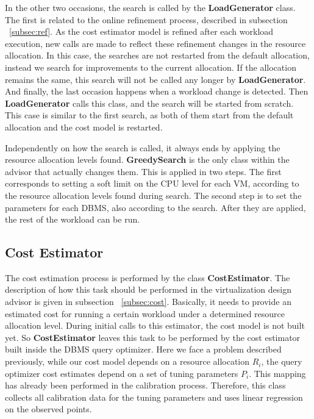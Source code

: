 In the other two occasions, the search is called by the \textbf{LoadGenerator} class. The first is related to the online refinement process, described in subsection ~\ref{subsec:ref}. As the cost estimator model is refined after each workload execution, new calls are made to reflect these refinement changes in the resource allocation. In this case, the searches are not restarted from the default allocation, instead we search for improvements to the current allocation. If the allocation remains the same, this search will not be called any longer by \textbf{LoadGenerator}. And finally, the last occasion happens when a workload change is detected. Then \textbf{LoadGenerator} calls this class, and the search will be started from scratch. This case is similar to the first search, as both of them start from the default allocation and the cost model is restarted.

Independently on how the search is called, it always ends by applying the resource allocation levels found. \textbf{GreedySearch} is the only class within the advisor that actually changes them. This is applied in two steps. The first corresponds to setting a soft limit on the CPU level for each VM, according to the resource allocation levels found during search. The second step is to set the parameters for each DBMS, also according to the search. After they are applied, the rest of the workload can be run.

\subsection{Cost Estimator}

The cost estimation process is performed by the class \textbf{CostEstimator}. The description of how this task should be performed in the virtualization design advisor is given in subsection ~\ref{subsec:cost}. Basically, it needs to provide an estimated cost for running a certain workload under a determined resource allocation level. During initial calls to this estimator, the cost model is not built yet. So \textbf{CostEstimator} leaves this task to be performed by the cost estimator built inside the DBMS query optimizer. Here we face a problem described previously, while our cost model depends on a resource allocation $R_{i}$, the query optimizer cost estimates depend on a set of tuning parameters $P_{i}$. This mapping has already been performed in the calibration process. Therefore, this class collects all calibration data for the tuning parameters and uses linear regression on the observed points. 

